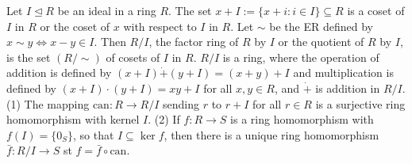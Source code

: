  Let $I \trianglelefteq R$ be an ideal in a ring $R$. The set $x + I := \{x + i : i \in I\} \subseteq R$ is a coset of $I$ in $R$ or the coset of $x$ with respect to $I$ in $R$.
 Let $\sim$ be the ER defined by $x \sim y \Leftrightarrow x - y \in I$. Then $R/I$, the factor ring of $R$ by $I$ or the quotient of $R$ by $I$, is the set $(R/\sim)$ of cosets of $I$ in $R$.
 $R/I$ is a ring, where the operation of addition is defined by $(x + I) \dot{+} (y + I) = (x + y) + I$ and multiplication is defined by $(x + I)\cdot(y + I) = xy + I$ for all $x, y \in R$, and $\dot{+}$ is addition in $R/I$.
(1) The mapping $\text{can} : R \rightarrow R/I$ sending $r$ to $r + I$ for all $r \in R$ is a surjective ring homomorphism with kernel $I$.
(2) If $f : R \to S$ is a ring homomorphism with $f(I) = \{0_S\}$, so that $I \subseteq \ker f$, then there is a unique ring homomorphism $\bar{f} : R/I \to S$ st $f = \bar{f} \circ \text{can}$.